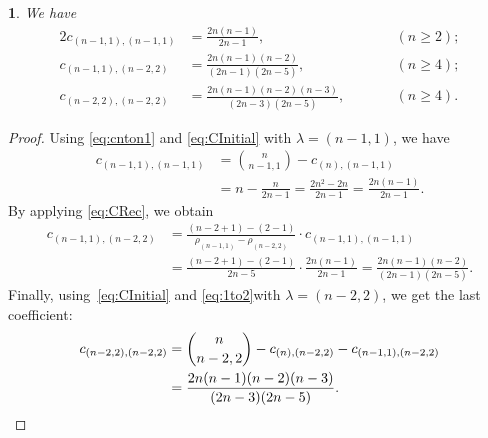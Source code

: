 \documentclass[smallextended]{svjour3}
\newtheorem{thm}{\protect\theoremname}
\providecommand{\theoremname}{Theorem}
\begin{document}
\begin{thm}
\label{thm:fam1}
We have
\begin{alignat*}{2}
  c_{(n-1,1),(n-1,1)} &= \frac{2n(n-1)}{2n-1}, &\qquad& (n\geq2); \\
  c_{(n-1,1),(n-2,2)} &= \frac{2n(n-1)(n-2)}{(2n-1)(2n-5)}, && (n\geq4); \\
  c_{(n-2,2),(n-2,2)} &= \frac{2n(n-1)(n-2)(n-3)}{(2n-3)(2n-5)}, &&(n\geq4).
\end{alignat*}
\end{thm}
\begin{proof}
Using \eqref{eq:cnton1} and  \eqref{eq:CInitial} with $\lambda=(n-1,1)$, we have
\begin{align*}
 c_{(n-1,1),(n-1,1)}&=\binom{n}{n-1,1}-c_{(n),(n-1,1)}\\
&=n-\frac{n}{2n-1}=\frac{2n^{2}-2n}{2n-1}=\frac{2n\left(n-1\right)}{2n-1}.
\end{align*}
By applying \eqref{eq:CRec}, we obtain
\begin{align*}
  c_{(n-1,1),(n-2,2)}
  &= \frac{(n-2+1)-(2-1)}{\rho_{(n-1,1)}-\rho_{(n-2,2)}}\cdot c_{(n-1,1),(n-1,1)}\\
  &= \frac{(n-2+1)-(2-1)}{2n-5}\cdot\frac{2n(n-1)}{2n-1}= \frac{2n(n-1)(n-2)}{(2n-1)(2n-5)}.
\end{align*}
Finally, using~\eqref{eq:CInitial} and \eqref{eq:1to2}with $\lambda=(n-2,2)$, we get the last coefficient:
\begin{align*}
 c_{(n-2,2),(n-2,2)}&=\binom{n}{n-2,2}-c_{(n),(n-2,2)}-c_{(n-1,1),(n-2,2)}\\
&=\frac{2n(n-1)(n-2)(n-3)}{(2n-3)(2n-5)}. \hspace*{\fill} 
\end{align*}
\end{proof}
\end{document}
